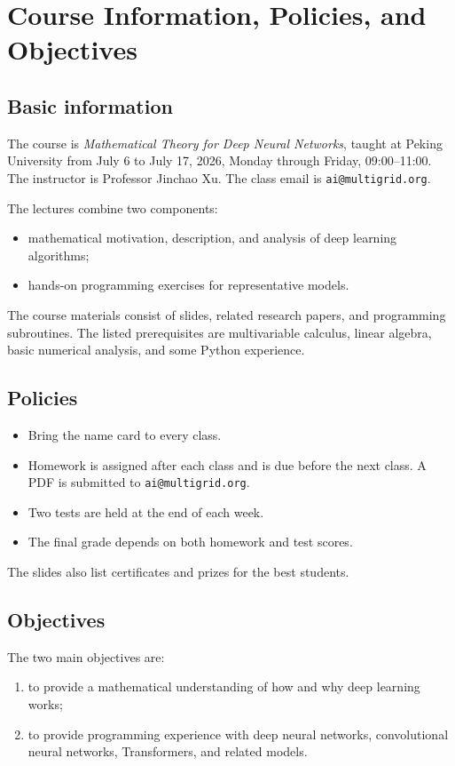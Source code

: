 \documentclass[11pt,a4paper]{article}
\theoremstyle{definition}
\theoremstyle{plain}
\theoremstyle{remark}
\begin{document}
\section{Course Information, Policies, and Objectives}

\subsection{Basic information}
The course is \emph{Mathematical Theory for Deep Neural Networks}, taught at Peking University from July 6 to July 17, 2026, Monday through Friday, 09:00--11:00. The instructor is Professor Jinchao Xu. The class email is \texttt{ai@multigrid.org}.

The lectures combine two components:
\begin{itemize}
  \item mathematical motivation, description, and analysis of deep learning algorithms;
  \item hands-on programming exercises for representative models.
\end{itemize}
The course materials consist of slides, related research papers, and programming subroutines. The listed prerequisites are multivariable calculus, linear algebra, basic numerical analysis, and some Python experience.

\subsection{Policies}
\begin{itemize}
  \item Bring the name card to every class.
  \item Homework is assigned after each class and is due before the next class. A PDF is submitted to \texttt{ai@multigrid.org}.
  \item Two tests are held at the end of each week.
  \item The final grade depends on both homework and test scores.
\end{itemize}
The slides also list certificates and prizes for the best students.

\subsection{Objectives}
The two main objectives are:
\begin{enumerate}
  \item to provide a mathematical understanding of how and why deep learning works;
  \item to provide programming experience with deep neural networks, convolutional neural networks, Transformers, and related models.
\end{enumerate}
\end{document}
